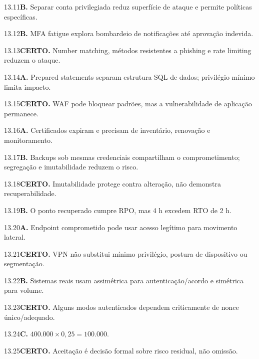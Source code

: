 \begin{solucao}{13.11}\textbf{B.} Separar conta privilegiada reduz superfície de ataque e permite políticas específicas.\end{solucao}
\begin{solucao}{13.12}\textbf{B.} MFA fatigue explora bombardeio de notificações até aprovação indevida.\end{solucao}
\begin{solucao}{13.13}\textbf{CERTO.} Number matching, métodos resistentes a phishing e rate limiting reduzem o ataque.\end{solucao}
\begin{solucao}{13.14}\textbf{A.} Prepared statements separam estrutura SQL de dados; privilégio mínimo limita impacto.\end{solucao}
\begin{solucao}{13.15}\textbf{CERTO.} WAF pode bloquear padrões, mas a vulnerabilidade de aplicação permanece.\end{solucao}
\begin{solucao}{13.16}\textbf{A.} Certificados expiram e precisam de inventário, renovação e monitoramento.\end{solucao}
\begin{solucao}{13.17}\textbf{B.} Backups sob mesmas credenciais compartilham o comprometimento; segregação e imutabilidade reduzem o risco.\end{solucao}
\begin{solucao}{13.18}\textbf{CERTO.} Imutabilidade protege contra alteração, não demonstra recuperabilidade.\end{solucao}
\begin{solucao}{13.19}\textbf{B.} O ponto recuperado cumpre RPO, mas 4 h excedem RTO de 2 h.\end{solucao}
\begin{solucao}{13.20}\textbf{A.} Endpoint comprometido pode usar acesso legítimo para movimento lateral.\end{solucao}
\begin{solucao}{13.21}\textbf{CERTO.} VPN não substitui mínimo privilégio, postura de dispositivo ou segmentação.\end{solucao}
\begin{solucao}{13.22}\textbf{B.} Sistemas reais usam assimétrica para autenticação/acordo e simétrica para volume.\end{solucao}
\begin{solucao}{13.23}\textbf{CERTO.} Alguns modos autenticados dependem criticamente de nonce único/adequado.\end{solucao}
\begin{solucao}{13.24}\textbf{C.} $400.000\times0,25=100.000$.\end{solucao}
\begin{solucao}{13.25}\textbf{CERTO.} Aceitação é decisão formal sobre risco residual, não omissão.\end{solucao}

